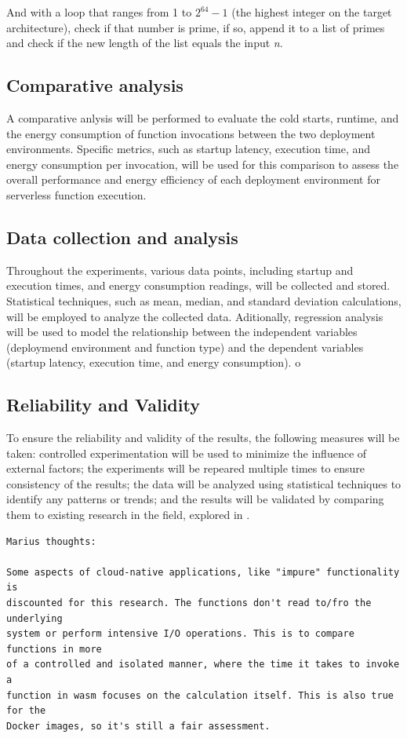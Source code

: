 \documentclass[
  table]{report}
\begin{document}
And with a loop that ranges from 1 to \(2^{64} - 1\) (the highest
integer on the target architecture), check if that number is prime, if
so, append it to a list of primes and check if the new length of the
list equals the input \emph{n}.

\subsection{Comparative analysis}

A comparative anlysis will be performed to evaluate the cold starts,
runtime, and the energy consumption of function invocations between the
two deployment environments. Specific metrics, such as startup latency,
execution time, and energy consumption per invocation, will be used for
this comparison to assess the overall performance and energy efficiency
of each deployment environment for serverless function execution.

\subsection{Data collection and analysis}

Throughout the experiments, various data points, including startup and
execution times, and energy consumption readings, will be collected and
stored. Statistical techniques, such as mean, median, and standard
deviation calculations, will be employed to analyze the collected data.
Aditionally, regression analysis will be used to model the relationship
between the independent variables (deploymend environment and function
type) and the dependent variables (startup latency, execution time, and
energy consumption). o

\subsection{Reliability and Validity}

To ensure the reliability and validity of the results, the following
measures will be taken: controlled experimentation will be used to
minimize the influence of external factors; the experiments will be
repeared multiple times to ensure consistency of the results; the data
will be analyzed using statistical techniques to identify any patterns
or trends; and the results will be validated by comparing them to
existing research in the field, explored in .

\begin{verbatim}
Marius thoughts:

Some aspects of cloud-native applications, like "impure" functionality is
discounted for this research. The functions don't read to/fro the underlying
system or perform intensive I/O operations. This is to compare functions in more
of a controlled and isolated manner, where the time it takes to invoke a
function in wasm focuses on the calculation itself. This is also true for the
Docker images, so it's still a fair assessment. 
\end{verbatim}
\end{document}

